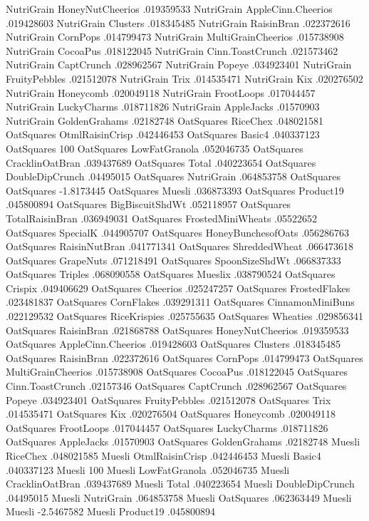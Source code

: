 NutriGrain	HoneyNutCheerios	.019359533
NutriGrain	AppleCinn.Cheerios	.019428603
NutriGrain	Clusters	.018345485
NutriGrain	RaisinBran	.022372616
NutriGrain	CornPops	.014799473
NutriGrain	MultiGrainCheerios	.015738908
NutriGrain	CocoaPus	.018122045
NutriGrain	Cinn.ToastCrunch	.021573462
NutriGrain	CaptCrunch	.028962567
NutriGrain	Popeye	.034923401
NutriGrain	FruityPebbles	.021512078
NutriGrain	Trix	.014535471
NutriGrain	Kix	.020276502
NutriGrain	Honeycomb	.020049118
NutriGrain	FrootLoops	.017044457
NutriGrain	LuckyCharms	.018711826
NutriGrain	AppleJacks	.01570903
NutriGrain	GoldenGrahams	.02182748
OatSquares	RiceChex	.048021581
OatSquares	OtmlRaisinCrisp	.042446453
OatSquares	Basic4	.040337123
OatSquares	100%
OatSquares	LowFatGranola	.052046735
OatSquares	CracklinOatBran	.039437689
OatSquares	Total	.040223654
OatSquares	DoubleDipCrunch	.04495015
OatSquares	NutriGrain	.064853758
OatSquares	OatSquares	-1.8173445
OatSquares	Muesli	.036873393
OatSquares	Product19	.045800894
OatSquares	BigBiscuitShdWt	.052118957
OatSquares	TotalRaisinBran	.036949031
OatSquares	FrostedMiniWheats	.05522652
OatSquares	SpecialK	.044905707
OatSquares	HoneyBunchesofOats	.056286763
OatSquares	RaisinNutBran	.041771341
OatSquares	ShreddedWheat	.066473618
OatSquares	GrapeNuts	.071218491
OatSquares	SpoonSizeShdWt	.066837333
OatSquares	Triples	.068090558
OatSquares	Mueslix	.038790524
OatSquares	Crispix	.049406629
OatSquares	Cheerios	.025247257
OatSquares	FrostedFlakes	.023481837
OatSquares	CornFlakes	.039291311
OatSquares	CinnamonMiniBuns	.022129532
OatSquares	RiceKrispies	.025755635
OatSquares	Wheaties	.029856341
OatSquares	RaisinBran	.021868788
OatSquares	HoneyNutCheerios	.019359533
OatSquares	AppleCinn.Cheerios	.019428603
OatSquares	Clusters	.018345485
OatSquares	RaisinBran	.022372616
OatSquares	CornPops	.014799473
OatSquares	MultiGrainCheerios	.015738908
OatSquares	CocoaPus	.018122045
OatSquares	Cinn.ToastCrunch	.02157346
OatSquares	CaptCrunch	.028962567
OatSquares	Popeye	.034923401
OatSquares	FruityPebbles	.021512078
OatSquares	Trix	.014535471
OatSquares	Kix	.020276504
OatSquares	Honeycomb	.020049118
OatSquares	FrootLoops	.017044457
OatSquares	LuckyCharms	.018711826
OatSquares	AppleJacks	.01570903
OatSquares	GoldenGrahams	.02182748
Muesli	RiceChex	.048021585
Muesli	OtmlRaisinCrisp	.042446453
Muesli	Basic4	.040337123
Muesli	100%
Muesli	LowFatGranola	.052046735
Muesli	CracklinOatBran	.039437689
Muesli	Total	.040223654
Muesli	DoubleDipCrunch	.04495015
Muesli	NutriGrain	.064853758
Muesli	OatSquares	.062363449
Muesli	Muesli	-2.5467582
Muesli	Product19	.045800894
